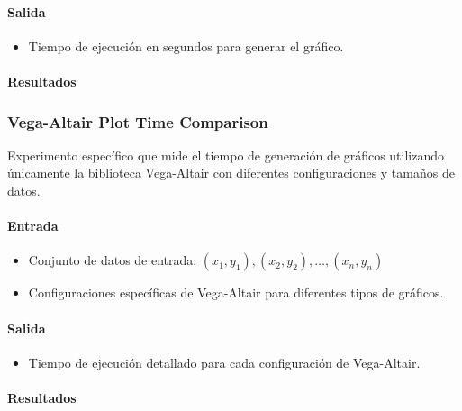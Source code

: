 \paragraph{Salida}
\begin{itemize}
    \item Tiempo de ejecución en segundos para generar el gráfico.
\end{itemize}

\newpage
\paragraph{Resultados}
\vspace{0.5em}
\noindent
\AllLibrariesTimeComparison
\newpage


\subsubsection{Vega-Altair Plot Time Comparison}
\label{vega_altair_plot_time}

Experimento específico que mide el tiempo de generación de gráficos utilizando únicamente la biblioteca Vega-Altair con diferentes configuraciones y tamaños de datos.

\paragraph{Entrada}
\begin{itemize}
    \item Conjunto de datos de entrada: \( (x_1, y_1), (x_2, y_2), \ldots, (x_n, y_n) \)
    \item Configuraciones específicas de Vega-Altair para diferentes tipos de gráficos.
\end{itemize}

\paragraph{Salida}
\begin{itemize}
    \item Tiempo de ejecución detallado para cada configuración de Vega-Altair.
\end{itemize}

\newpage
\paragraph{Resultados}
\vspace{0.5em}
\noindent
\VegaAltairPlotTimeComparison
\newpage

